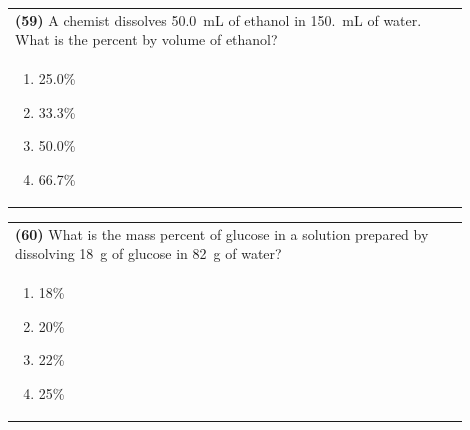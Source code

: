 \documentclass{article}
\begin{document}
\vspace{0.2cm}
\noindent\begin{tabular}{|p{0.9\linewidth}|}
\hline
\textbf{(59)} A chemist dissolves 50.0~mL of ethanol in 150.~mL of water. What is the percent by volume of ethanol?\\[0.2cm]
\begin{minipage}[t]{0.85\linewidth}
\begin{enumerate}[label=\alph*.]
\item 25.0\%
\item 33.3\%
\item 50.0\%
\item 66.7\%
\end{enumerate}
\end{minipage}\\[0.2cm]
\hline
\end{tabular}

\vspace{0.2cm}
\noindent\begin{tabular}{|p{0.9\linewidth}|}
\hline
\textbf{(60)} What is the mass percent of glucose in a solution prepared by dissolving 18~g of glucose in 82~g of water?\\[0.2cm]
\begin{minipage}[t]{0.85\linewidth}
\begin{enumerate}[label=\alph*.]
\item 18\%
\item 20\%
\item 22\%
\item 25\%
\end{enumerate}
\end{minipage}\\[0.2cm]
\hline
\end{tabular}
\end{document}
